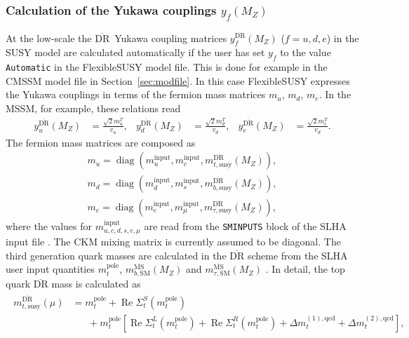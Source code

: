 \documentclass[final,3p,11pt,pdflatex]{elsarticle}
\makeatletter
\newcommand{\fs}{FlexibleSUSY\@\xspace}
\newcommand{\code}[1]{\lstinline|#1|}  %
\newcommand{\textoverline}[1]{$\overline{\mbox{#1}}$}
\newcommand{\DRbar}{\textoverline{DR}\xspace}
\newcommand{\MSbar}{\textoverline{MS}\xspace}
\newcommand{\userinput}{\text{input}}
\newcommand{\secref}[1]{Section~\ref{#1}}
\DeclareMathOperator{\diag}{diag}
\DeclareMathOperator{\re}{Re}
\makeatother
\begin{document}
\subsubsection{Calculation of the Yukawa couplings $y_f(M_Z)$}
\label{sec:calculation-of-yukawa-couplings}

At the low-scale the \DRbar\ Yukawa coupling matrices
$y_f^{\text{\DRbar}}(M_Z)$ ($f=u,d,e$) in the SUSY model are
calculated automatically if the user has set $y_f$ to the value
\code{Automatic} in the \fs model file.  This is done for example in
the CMSSM model file in \secref{sec:modfile}.  In this case \fs
expresses the Yukawa couplings in terms of the fermion mass matrices
$m_u$, $m_d$, $m_e$.  In the MSSM, for example, these relations read
%
\begin{align}
  y_u^{\text{\DRbar}}(M_Z) &= \frac{\sqrt{2} m_{u}^T}{v_u} , &
  y_d^{\text{\DRbar}}(M_Z) &= \frac{\sqrt{2} m_{d}^T}{v_d} , &
  y_e^{\text{\DRbar}}(M_Z) &= \frac{\sqrt{2} m_{e}^T}{v_d}.
\end{align}
%
The fermion mass matrices are composed as
%
\begin{align}
  m_u = \diag(m_{u}^{\userinput}, m_{c}^{\userinput}, m_{t,\text{susy}}^{\text{\DRbar}}(M_Z)) ,\\
  m_d = \diag(m_{d}^{\userinput}, m_{s}^{\userinput}, m_{b,\text{susy}}^{\text{\DRbar}}(M_Z)) ,\\
  m_e = \diag(m_{e}^{\userinput}, m_{\mu}^{\userinput}, m_{\tau,\text{susy}}^{\text{\DRbar}}(M_Z)),
\end{align}
%
where the values for $m_{u,c,d,s,e,\mu}^{\userinput}$ are read from
the \code{SMINPUTS} block of the SLHA input file \cite{Skands:2003cj}.
The CKM mixing matrix is currently assumed to be diagonal.  The third
generation quark masses are calculated in the \DRbar scheme from the
SLHA user input quantities $m_t^\text{pole}$,
$m_{b,\text{SM}}^{\text{\MSbar}}(M_Z)$ and
$m_{\tau,\text{SM}}^{\text{\MSbar}}(M_Z)$ \cite{Skands:2003cj}.  In
detail, the top quark \DRbar mass is calculated as
%
\begin{align}
  \begin{split}
    m_{t,\text{susy}}^{\text{\DRbar}}(\mu) &= m_t^\text{pole} +
    \re\Sigma_{t}^{S}(m_t^\text{pole}) \\
    &\phantom{=\;} + m_t^\text{pole}
    \left[ \re\Sigma_{t}^{L}(m_t^\text{pole}) +
      \re\Sigma_{t}^{R}(m_t^\text{pole}) + \Delta
      m_t^{(1),\text{qcd}} + \Delta m_t^{(2),\text{qcd}} \right] ,
  \end{split}
\end{align}
\end{document}
